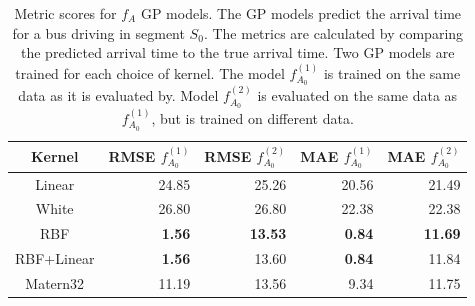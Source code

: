\begin{table}
    \centering
    \caption[Metric scores for $f_A$ GP models]%
    {{\small Metric scores for $f_A$ GP models.
    The GP models predict the arrival time for a bus driving in segment $S_0$.
    The metrics are calculated by comparing the predicted arrival time to the true arrival time. 
    Two GP models are trained for each choice of kernel. 
    The model $f^{(1)}_{A_0}$ is trained on the same data as it is evaluated by.
    Model $f^{(2)}_{A_0}$ is evaluated on the same data as $f^{(1)}_{A_0}$, but is trained on different data.}}
    \label{table:metric-scores} 
    \begin{tabular}{ |c|r|r|r|r| } 
        \hline
        Kernel & RMSE $f^{(1)}_{A_0}$ & RMSE $f^{(2)}_{A_0}$ & MAE $f^{(1)}_{A_0}$ & MAE $f^{(2)}_{A_0}$ \\ [0.5ex] 
        \hline
        Linear & 24.85 & 25.26 & 20.56 & 21.49 \\
        White & 26.80 & 26.80 & 22.38 & 22.38 \\
        RBF & \textbf{1.56} & \textbf{13.53} & \textbf{0.84} & \textbf{11.69} \\
        RBF+Linear & \textbf{1.56} & 13.60 & \textbf{0.84} & 11.84 \\
        Matern32 & 11.19 & 13.56 & 9.34 & 11.75 \\
        \hline
    \end{tabular}
\end{table}

